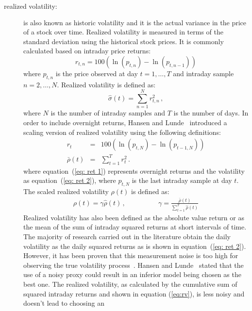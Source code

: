 \begin{description}
\item[realized volatility:] is also known as historic volatility and
it is the actual variance in the price of a stock over time.
Realized volatility is measured in terms of the standard deviation
using the historical stock prices. It is commonly calculated based on
intraday price returns:
\begin{equation}
\label{eq:retintra}
r_{t,n}=100(\ln(p_{t,n}) - \ln(p_{t,n-1}))
\end{equation}
\noindent where $p_{t,n}$ is the price observed at day $t=1,\dots,T$ and
intraday sample $n=2,\dots,N$. Realized volatility is defined as:
\begin{equation}
\label{eq:rv}
    \hat{\sigma}(t) = \sum_{n=1}^N r_{t,n}^2 \, , 
\end{equation}
\noindent where $N$ is the number of intraday samples and $T$ is the
number of days. 
In order to include overnight returns, Hansen and
Lunde~\cite{hansen+lunde2005} introduced a scaling version of
realized volatility using the following definitions:
\begin{eqnarray}
r_{t}&=&100(\ln(p_{t,N}) - \ln(p_{t-1,N})) \label{eq: ret 1} \\
\bar{\rho}(t) &=& \sum_{t=1}^T r_{t}^2  \label{eq: ret 2} \, .
\end{eqnarray}
\noindent where equation~(\ref{eq: ret 1}) represents overnight 
returns and the volatility as 
equation~(\ref{eq: ret 2}), where $p_{t,N}$ is the last intraday 
sample at day $t$. The scaled realized volatility $\rho(t)$ is 
defined as:
\begin{eqnarray}
\label{eq:srv}
\rho(t) = \gamma \hat{\rho}(t) \, , \qquad & \qquad \gamma = \displaystyle \frac{\bar{\rho}(t)}{\displaystyle\sum_{t=1}^T \hat{\rho}(t)}
\end{eqnarray}
Realized volatility has also been defined as the absolute value return or as
the mean of the sum of intraday squared returns at short intervals of time. The
majority of research carried out in the literature obtain the daily volatility
as the daily squared returns as is shown in equation~(\ref{eq: ret 2}).
However, it has been proven that this measurement noise is too high for
observing the true volatility process~\cite{andersen+bollerslev1998}. Hansen
and Lunde~\cite{hansen+lunde2006} stated that the use of a noisy proxy could
result in an inferior model being chosen as the best one. The realized
volatility, as calculated by the cumulative sum of squared intraday returns and
shown in equation (\ref{eq:rv}), is less noisy and doesn't lead to choosing an

\end{description}
